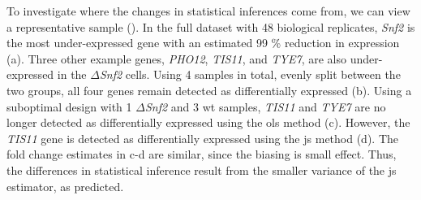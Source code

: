 
To investigate where the changes in statistical inferences come from, we can view a representative sample ().
In the full dataset with 48 biological replicates, \emph{Snf2} is the most under-expressed gene with an estimated 99 \% reduction in expression (a).
Three other example genes, \emph{PHO12}, \emph{TIS11}, and \emph{TYE7}, are also under-expressed in the $\Delta$\emph{Snf2} cells.
Using 4 samples in total, evenly split between the two groups, all four genes remain detected as differentially expressed (b).
Using a suboptimal design with 1 $\Delta$\emph{Snf2} and 3 \gls{wt} samples, \emph{TIS11} and \emph{TYE7} are no longer detected as differentially expressed using the \gls{ols} method (c).
However, the \emph{TIS11} gene is detected as differentially expressed using the \gls{js} method (d).
The fold change estimates in c-d are similar, since the biasing is small effect.
Thus, the differences in statistical inference result from the smaller variance of the \gls{js} estimator, as predicted.


